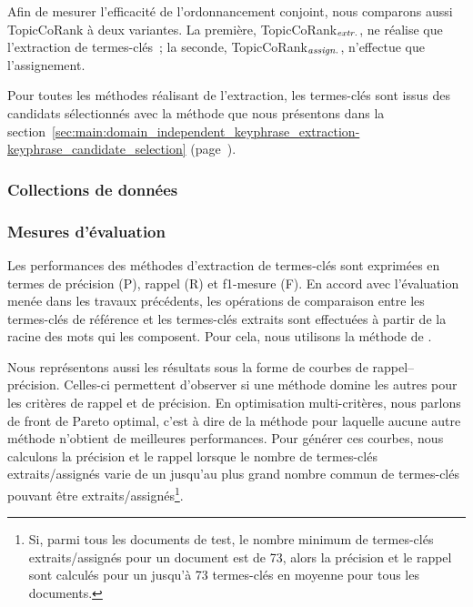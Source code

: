       Afin de mesurer l'efficacité de l'ordonnancement conjoint, nous
      comparons aussi TopicCoRank à deux variantes. La première,
      TopicCoRank$_\textnormal{\textit{extr.}}$, ne réalise que l'extraction
      de termes-clés~; la seconde,
      TopicCoRank$_\textnormal{\textit{assign.}}$, n'effectue que
      l'assignement.

      Pour toutes les méthodes réalisant de l'extraction, les termes-clés sont
      issus des candidats sélectionnés avec la méthode que nous présentons
      dans la
      section~\ref{sec:main:domain_independent_keyphrase_extraction-keyphrase_candidate_selection}
      (page~\pageref{sec:main:domain_independent_keyphrase_extraction-keyphrase_candidate_selection}).

    \subsubsection{Collections de données}
    \label{subsubsec:main-domain_specific_keyphrase_annotation-supervised_automatic_keyphrase_annotation-evaluation-evaluation_data}
    
    \subsubsection{Mesures d'évaluation}
    \label{subsubsec:main-domain_specific_keyphrase_annotation-supervised_automatic_keyphrase_annotation-evaluation-evaluation_measures}
      Les performances des méthodes d'extraction de termes-clés sont exprimées
      en termes de précision (P), rappel (R) et f1-mesure (F). En
      accord avec l'évaluation menée dans les travaux précédents, les
      opérations de comparaison entre les termes-clés de référence et les
      termes-clés extraits sont effectuées à partir de la racine des mots qui
      les composent. Pour cela, nous utilisons la méthode de
      .

      Nous représentons aussi les résultats sous la forme de courbes de
      rappel--précision. Celles-ci permettent d'observer si une méthode domine
      les autres pour les critères de rappel et de précision. En optimisation
      multi-critères, nous parlons de front de Pareto optimal, c'est à dire de
      la méthode pour laquelle aucune autre méthode n'obtient de meilleures
      performances. Pour générer ces courbes, nous calculons la précision et
      le rappel lorsque  le nombre de termes-clés extraits/assignés varie de
      un jusqu'au plus grand nombre commun de termes-clés pouvant être
      extraits/assignés\footnote{Si, parmi tous les documents de test, le
      nombre minimum de termes-clés extraits/assignés pour un document est de
      73, alors la précision et le rappel sont calculés pour un jusqu'à 73
      termes-clés en moyenne pour tous les documents.}.
    
